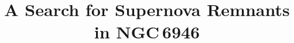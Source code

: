%


\usepackage{natbib}
\usepackage{comment}
\usepackage{todonotes}



\title{A Search for Supernova Remnants in NGC\,6946}



